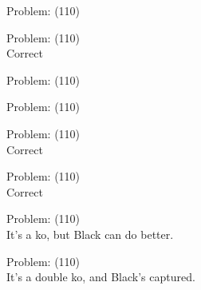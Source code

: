 \documentclass[11pt]{article}
\begin{document}
\begin{minipage}[t]{0.5\textwidth}
  {\centering
  
  Problem: (110)\\
  
  }
\end{minipage}
\begin{minipage}[t]{0.5\textwidth}
  {\centering
  
  Problem: (110)\\
  Correct\\
  }
\end{minipage}
\begin{minipage}[t]{0.5\textwidth}
  {\centering
  
  Problem: (110)\\
  
  }
\end{minipage}
\begin{minipage}[t]{0.5\textwidth}
  {\centering
  
  Problem: (110)\\
  
  }
\end{minipage}
\begin{minipage}[t]{0.5\textwidth}
  {\centering
  
  Problem: (110)\\
  Correct\\
  }
\end{minipage}
\begin{minipage}[t]{0.5\textwidth}
  {\centering
  
  Problem: (110)\\
  Correct\\
  }
\end{minipage}
\begin{minipage}[t]{0.5\textwidth}
  {\centering
  
  Problem: (110)\\
  It's a ko, but Black can do better.\\
  }
\end{minipage}
\begin{minipage}[t]{0.5\textwidth}
  {\centering
  
  Problem: (110)\\
  It's a double ko, and Black's captured.\\
  }
\end{minipage}
\end{document}
